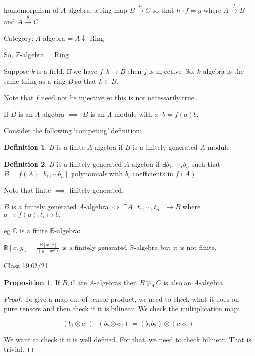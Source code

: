 \documentclass{article}
\theoremstyle{definition}
\newtheorem{definition}{Definition}
\newtheorem{proposition}{Proposition}
\begin{document}
homomorphism of \(A\)-algebra: a ring map \(B \overset{h}{\to} C\) so that \(h\circ f = g\) where \(A\overset{f}{\to } B\) and \(A \overset{g}{\to } C\) 

Category: \(A\)-algebra = \(A\downarrow\) Ring

So, \(\mathbb{Z}\)-algebra = Ring

Suppose \(k\) is a field. If we have \(f:k\to B\) then \(f\) is injective. So, \(k\)-algebra is the same thing as a ring \(B\) so that \(k \subset B\).

Note that \(f\) need not be injective so this is not necessarily true.

If \(B\) is an \(A\)-algebra \(\implies \) \(B\) is an \(A\)-module with \(a\cdot b = f(a)b\).

Consider the following `competing' definition:

\begin{definition}
    \(B\) is a finite \(A\)-algebra if \(B\) is a finitely generated \(A\)-module
\end{definition}

\begin{definition}
    \(B\) is a finitely generated \(A\)-algebra if \(\exists b_1,\cdots,b_n\) such that \(B = f(A)[b_1,\cdots b_n]\) polynomials with \(b_i\) coefficients in \(f(A)\)
\end{definition}

Note that finite \(\implies \) finitely generated.

\(B\) is a finitely generated \(A\)-algebra \(\iff\) \(\exists A[t_1,\cdots,t_n]\rightarrow B\) where \(a \mapsto f(a),t_i \mapsto b_i\) 

eg \(\mathbb{C}\) is a finite \(\mathbb{R}\)-algebra:

\(\mathbb{R}[\overline{x} ,\overline{y} ]=\frac{\mathbb{R}[x,y]}{(y-x^2)}\) is a finitely generated \(\mathbb{R}\)-algebra but it is not finite. 

\hrulefill

Class 19:02/21

\begin{proposition}
    If \(B,C\) are \(A\)-algebras then \(B \otimes _A C\) is also an \(A\)-algebra
\end{proposition}

\begin{proof}
    To give a map out of tensor product, we need to check what it does on pure tensors and then check if it is bilinear. We check the multiplication map:

    \[
        (b_1 \otimes c_1)\cdot (b_2 \otimes c_2) \coloneqq (b_1 b_2) \otimes (c_1 c_2)
    \]

    We want to check if it is well defined. For that, we need to check bilinear. That is trivial.

\end{proof}
\end{document}
